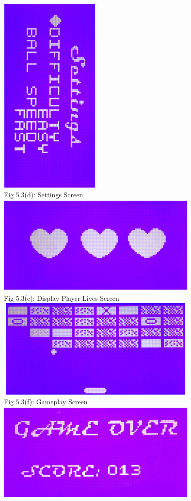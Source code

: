 \documentclass[a4paper,12pt,oneside]{book}
\begin{document}
\begin{center}
\includegraphics[width=5cm, height=10cm, angle = 90]{BreakoutImages/settingsScreen} \\
{\small Fig 5.3(d): Settings Screen} \\
\includegraphics[width=10cm, height=5cm]{BreakoutImages/livesDisplayScreen} \\
{\small Fig 5.3(e): Display Player Lives Screen} \\
\includegraphics[width=10cm, height=5cm]{BreakoutImages/gameplayScreen} \\
{\small Fig 5.3(f): Gameplay Screen} \\
\includegraphics[width=10cm, height=5cm]{BreakoutImages/gameoverScreen} \\

\end{center}
\end{document}
